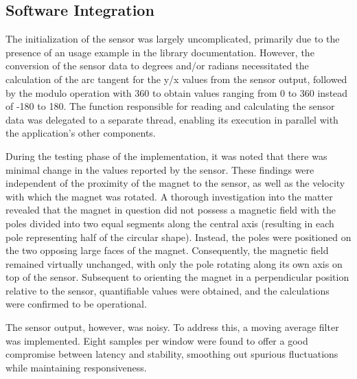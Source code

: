 	\subsection{Software Integration}
	The initialization of the sensor was largely uncomplicated, primarily due to the presence of an usage example in the library documentation. However, the conversion of the sensor data to degrees and/or radians necessitated the calculation of the arc tangent for the y/x values from the sensor output, followed by the modulo operation with 360 to obtain values ranging from 0 to 360 instead of -180 to 180. The function responsible for reading and calculating the sensor data was delegated to a separate thread, enabling its execution in parallel with the application's other components. 
	
	During the testing phase of the implementation, it was noted that there was minimal change in the values reported by the sensor. These findings were independent of the proximity of the magnet to the sensor, as well as the velocity with which the magnet was rotated. A thorough investigation into the matter revealed that the magnet in question did not possess a magnetic field with the poles divided into two equal segments along the central axis (resulting in each pole representing half of the circular shape). Instead, the poles were positioned on the two opposing large faces of the magnet. Consequently, the magnetic field remained virtually unchanged, with only the pole rotating along its own axis on top of the sensor. Subsequent to orienting the magnet in a perpendicular position relative to the sensor, quantifiable values were obtained, and the calculations were confirmed to be operational.
	
	The sensor output, however, was noisy. To address this, a moving average filter was implemented. Eight samples per window were found to offer a good compromise between latency and stability, smoothing out spurious fluctuations while maintaining responsiveness.
